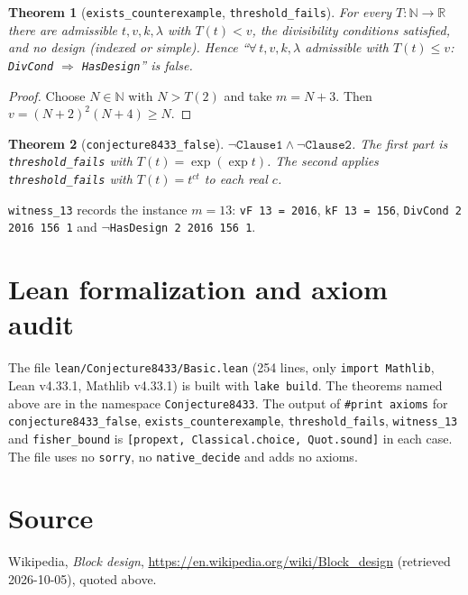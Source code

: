 \documentclass[11pt]{article}
\newtheorem{theorem}{Theorem}
\theoremstyle{definition}
\begin{document}
\begin{theorem}[\texttt{exists\_counterexample}, \texttt{threshold\_fails}]
For every $T:\mathbb N\to\mathbb R$ there are admissible $t,v,k,\lambda$ with $T(t)<v$, the
divisibility conditions satisfied, and no design (indexed or simple). Hence
``$\forall\,t,v,k,\lambda$ admissible with $T(t)\le v$: \texttt{DivCond} $\Rightarrow$
\texttt{HasDesign}'' is false.
\end{theorem}
\begin{proof}
Choose $N\in\mathbb N$ with $N>T(2)$ and take $m=N+3$. Then $v=(N+2)^2(N+4)\ge N$.
\end{proof}

\begin{theorem}[\texttt{conjecture8433\_false}]
$\neg\texttt{Clause1}\wedge\neg\texttt{Clause2}$. The first part is \texttt{threshold\_fails} with
$T(t)=\exp(\exp t)$. The second applies \texttt{threshold\_fails} with $T(t)=t^{ct}$ to each real $c$.
\end{theorem}

\texttt{witness\_13} records the instance $m=13$: \texttt{vF 13 = 2016}, \texttt{kF 13 = 156},
\texttt{DivCond 2 2016 156 1} and $\neg$\texttt{HasDesign 2 2016 156 1}.

\section{Lean formalization and axiom audit}

The file \texttt{lean/Conjecture8433/Basic.lean} (254 lines, only \texttt{import Mathlib}, Lean
v4.33.1, Mathlib v4.33.1) is built with \texttt{lake build}. The theorems named above are in the
namespace \texttt{Conjecture8433}. The output of \texttt{\#print axioms} for
\texttt{conjecture8433\_false}, \texttt{exists\_counterexample}, \texttt{threshold\_fails},
\texttt{witness\_13} and \texttt{fisher\_bound} is
\texttt{[propext, Classical.choice, Quot.sound]} in each case. The file uses no \texttt{sorry}, no
\texttt{native\_decide} and adds no axioms.

\section*{Source}
Wikipedia, \emph{Block design}, \url{https://en.wikipedia.org/wiki/Block_design} (retrieved
2026-10-05), quoted above.
\end{document}
